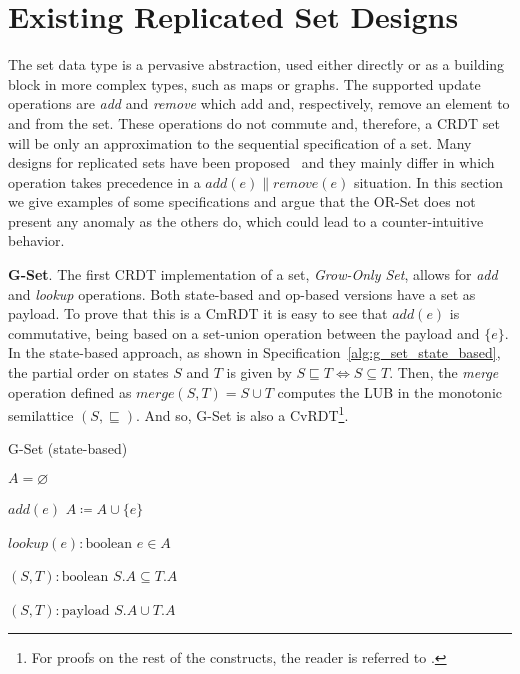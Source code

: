 \section{Existing Replicated Set Designs}
\label{sec:existing_sets}

The set data type is a pervasive abstraction, used either directly or as a
building block in more complex types, such as maps or graphs. The supported
update operations are \textit{add} and \textit{remove} which add and,
respectively, remove an element to and from the set. These operations do not
commute and, therefore, a CRDT set will be only an approximation to the
sequential specification of a set. Many designs for replicated sets have been
proposed~\cite{shapiro:inria-00555588} and they mainly differ in which operation
takes precedence in a $\textit{add}(e) \parallel \textit{remove}(e)$ situation.
In this section we give examples of some specifications and argue that the
OR-Set does not present any anomaly as the others do, which could lead to a
counter-intuitive behavior.

\textbf{G-Set}. The first CRDT implementation of a set, \textit{Grow-Only Set},
allows for \textit{add} and \textit{lookup} operations. Both state-based and
op-based versions have a set as payload. To prove that this is a CmRDT it is
easy to see that $\textit{add}(e)$ is commutative, being based on a set-union
operation between the payload and $\{e\}$. In the state-based approach, as shown
in Specification~\ref{alg:g_set_state_based}, the partial order on states $S$
and $T$ is given by $S \sqsubseteq T \iff S \subseteq T$. Then, the
\textit{merge} operation defined as $\textit{merge}(S,T) = S \cup T$ computes
the LUB in the monotonic semilattice $(S, \sqsubseteq)$. And so, G-Set is also a
CvRDT\footnote{For proofs on the rest of the constructs, the reader is
referred to \cite{shapiro:inria-00555588}.}.

\begin{algorithm}[t]
\small{
	\caption{G-Set (state-based)}
 	\label{alg:g_set_state_based}                       

 	\begin{algorithmic}[1]
 	  \State \Payload $A = \varnothing$
 	  
 	  \State \Update $add(e)$
 	  \State \hspace{\algorithmicindent} $A \coloneqq A \cup \{e\}$
 	  
 	  \State \Query $lookup(e) : \text{boolean}$
 	  \State \hspace{\algorithmicindent} \Return $e \in A$
 	  
 	  \State \Compare $(S, T) : \text{boolean}$
 	  \State \hspace{\algorithmicindent} \Return $S.A \subseteq T.A$
 	  
 	  \State \Merge $(S, T) : \text{payload}$
 	  \State \hspace{\algorithmicindent} \Return $S.A \cup T.A$
	\end{algorithmic}
 }
\end{algorithm}

